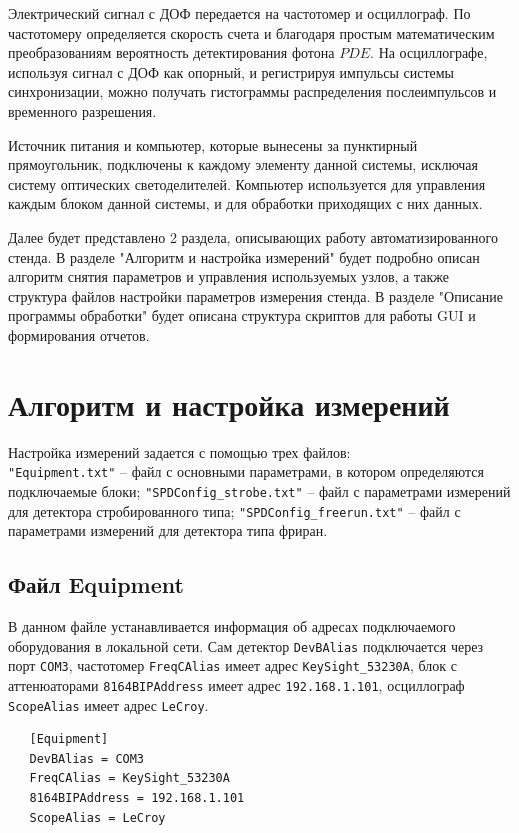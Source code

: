 \documentclass[12pt]{article}
\begin{document}
Электрический сигнал с ДОФ передается на частотомер и осциллограф. По частотомеру определяется скорость счета и благодаря простым математическим преобразованиям вероятность детектирования фотона $PDE$. На осциллографе, используя сигнал с ДОФ как опорный, и регистрируя импульсы системы синхронизации, можно получать гистограммы распределения послеимпульсов и временного разрешения. 

Источник питания и компьютер, которые вынесены за пунктирный прямоугольник, подключены к каждому элементу данной системы, исключая систему оптических светоделителей. Компьютер используется для управления каждым блоком данной системы, и для обработки приходящих с них данных. 


Далее будет представлено 2 раздела, описывающих работу автоматизированного стенда. В разделе "Алгоритм и настройка измерений" будет подробно описан алгоритм снятия параметров и управления используемых узлов, а также  структура файлов настройки параметров измерения стенда. В разделе "Описание программы обработки" будет описана  структура скриптов для работы GUI и формирования отчетов.  


\section{Алгоритм и настройка измерений}
Настройка измерений задается с помощью трех файлов: \\ \verb|"Equipment.txt"| -- файл с основными параметрами, в котором определяются подключаемые блоки;  \verb|"SPDConfig_strobe.txt"| -- файл с параметрами измерений для детектора стробированного типа; \verb|"SPDConfig_freerun.txt"| -- файл с параметрами измерений для детектора типа фриран. 

\subsection{Файл Equipment}

В данном файле устанавливается информация об адресах подключаемого оборудования в локальной сети. Сам детектор \verb|DevBAlias|  подключается через порт  \verb|COM3|, частотомер \verb|FreqCAlias| имеет адрес \verb|KeySight_53230A|, блок с аттенюаторами \verb|8164BIPAddress| имеет адрес \verb|192.168.1.101|, осциллограф \verb|ScopeAlias| имеет адрес \verb|LeCroy|. 

\begin{lstlisting}
   [Equipment]
   DevBAlias = COM3
   FreqCAlias = KeySight_53230A
   8164BIPAddress = 192.168.1.101
   ScopeAlias = LeCroy
\end{lstlisting}
\end{document}
